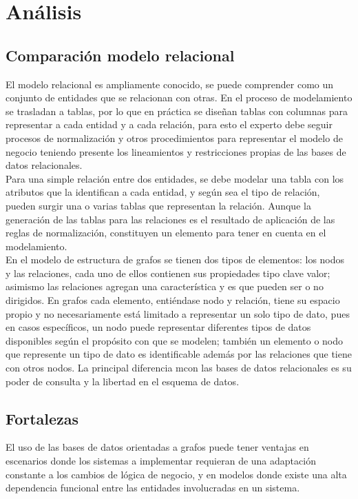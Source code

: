 \documentclass[preprint,12pt]{elsarticle}
\begin{document}

\section{Análisis}

\subsection{\textbf{Comparación modelo relacional}}
El modelo relacional es ampliamente conocido, se puede comprender como un conjunto de entidades que se relacionan con otras. En el proceso de modelamiento se trasladan a tablas, por lo que en práctica se diseñan tablas con columnas para representar a cada entidad y a cada relación, para esto el experto debe seguir procesos de normalización y otros procedimientos para representar el modelo de negocio teniendo presente los lineamientos y restricciones propias de las bases de datos relacionales.\\

Para una simple relación entre dos entidades, se debe modelar una tabla con los atributos que la identifican a cada entidad, y según sea el tipo de relación, pueden surgir una o varias tablas que representan la relación. Aunque la generación de las tablas para las relaciones es el resultado de aplicación de las reglas de normalización, constituyen un elemento para tener en cuenta en el modelamiento.\\

En el modelo de estructura de grafos se tienen dos tipos de elementos: los nodos y las relaciones, cada uno de ellos contienen sus propiedades tipo clave valor; asimismo las relaciones agregan una característica y es que pueden ser o no dirigidos. En grafos cada elemento, entiéndase nodo y relación, tiene su espacio propio y no necesariamente está limitado a representar un solo tipo de dato, pues en casos específicos, un nodo puede representar diferentes tipos de datos disponibles según el propósito con que se modelen; también un elemento o nodo que represente un tipo de dato es identificable además por las relaciones que tiene con otros nodos. La principal diferencia mcon las bases de datos relacionales es su poder de consulta y la libertad en el esquema de datos.\\


\subsection{\textbf{Fortalezas}}
El uso de las bases de datos orientadas a grafos puede tener ventajas en escenarios donde los sistemas a implementar requieran de una adaptación constante a los cambios de lógica de negocio, y en modelos donde existe una alta dependencia funcional entre las entidades involucradas en un sistema. \\
\end{document}
